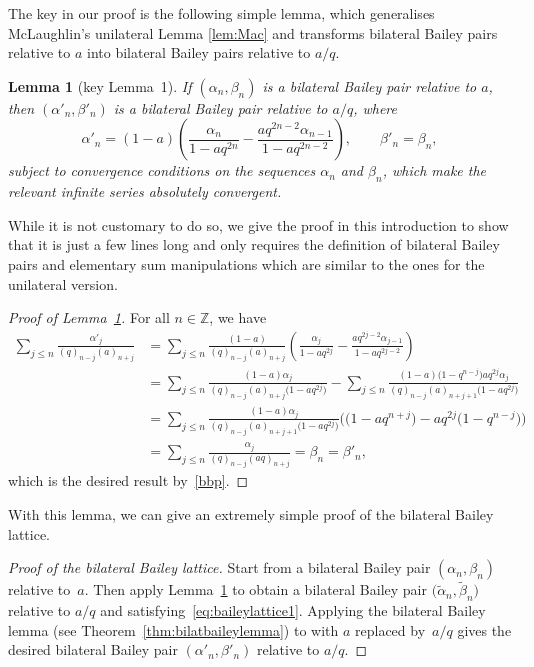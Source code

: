 \documentclass[pdftex]{sigma}
\numberwithin{equation}{section}
\newtheorem{Lemma}[Theorem]{Lemma}
\begin{document}
The key in our proof is the following simple lemma, which generalises McLaughlin's unilateral Lemma \ref{lem:Mac} and transforms bilateral Bailey pairs relative to $a$ into bilateral Bailey pairs relative to $a/q$.
\begin{Lemma}[key Lemma~1]\label{lem:key1}
If $(\alpha_n, \beta_n)$ is a bilateral Bailey pair relative to $a$, then $(\alpha'_n, \beta'_n)$ is a bilateral Bailey pair relative to $a/q$, where
\begin{equation}\label{eq:baileylattice1}
\alpha'_n=(1-a)\left(\frac{\alpha_n}{1-aq^{2n}}-\frac{aq^{2n-2}\alpha_{n-1}}{1-aq^{2n-2}}\right), \qquad \beta'_n=\beta_n,
\end{equation}
subject to convergence conditions on the sequences $\alpha_n$ and $\beta_n$, which make the relevant infinite series absolutely convergent.
\end{Lemma}
While it is not customary to do so, we give the proof in this introduction to show that it is just a few lines long and only requires the definition of bilateral Bailey pairs and elementary sum manipulations which are similar to the ones for the unilateral version.
\begin{proof}[Proof of Lemma~\ref{lem:key1}]
For all $n\in\mathbb{Z}$, we have
\begin{align*}
\sum_{j\leq n} \frac{\alpha'_j}{(q)_{n-j}(a)_{n+j}}&= \sum_{j\leq n} \frac{(1-a)}{(q)_{n-j}(a)_{n+j}}\left(\frac{\alpha_j}{1-aq^{2j}}-\frac{aq^{2j-2}\alpha_{j-1}}{1-aq^{2j-2}}\right)\\
&= \sum_{j\leq n} \frac{(1-a)\alpha_j}{(q)_{n-j}(a)_{n+j}\bigl(1-aq^{2j}\bigr)}-\sum_{j\leq n} \frac{(1-a)\bigl(1-q^{n-j}\bigr)aq^{2j}\alpha_{j}}{(q)_{n-j}(a)_{n+j+1}\bigl(1-aq^{2j}\bigr)}\\
&=\sum_{j\leq n} \frac{(1-a)\alpha_j}{(q)_{n-j}(a)_{n+j+1}\bigl(1-aq^{2j}\bigr)}\bigl(\bigl(1-aq^{n+j}\bigr)-aq^{2j}\bigl(1-q^{n-j}\bigr)\bigr)\\
&=\sum_{j\leq n} \frac{\alpha_j}{(q)_{n-j}(aq)_{n+j}}=\beta_n=\beta'_n,
\end{align*}
which is the desired result by~\eqref{bbp}.
\end{proof}
With this lemma, we can give an extremely simple proof of the bilateral Bailey lattice.
\begin{proof}[Proof of the bilateral Bailey lattice]
Start from a bilateral Bailey pair $(\alpha_n, \beta_n)$ relative to~$a$. Then apply Lemma~\ref{lem:key1} to obtain a bilateral Bailey pair $\bigl(\tilde{\alpha}_n, \tilde{\beta}_n\bigr)$ relative to $a/q$ and satisfying~\eqref{eq:baileylattice1}. Applying the bilateral Bailey lemma (see Theorem~\ref{thm:bilatbaileylemma}) to  with $a$ replaced by~$a/q$ gives the desired bilateral Bailey pair $(\alpha'_n, \beta'_n)$ relative to $a/q$.
\end{proof}
\end{document}
